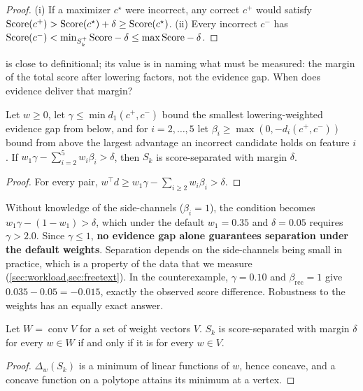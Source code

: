 \begin{proof}
(i) If a maximizer $c^\star$ were incorrect, any correct $c^+$ would satisfy $\mathrm{Score}(c^+) > \mathrm{Score}(c^\star) + \delta \geq \mathrm{Score}(c^\star)$. (ii) Every incorrect $c^-$ has $\mathrm{Score}(c^-) < \min_{S_k^+}\mathrm{Score} - \delta \leq \max\mathrm{Score} - \delta$.
\end{proof}

 is close to definitional; its value is in naming what must be measured: the margin of the total score after lowering factors, not the evidence gap. When does evidence deliver that margin?

\begin{proposition}
\label{prop:evidence}
Let $w \geq 0$, let $\gamma \leq \min d_1(c^+, c^-)$ bound the smallest lowering-weighted evidence gap from below, and for $i = 2, \dots, 5$ let $\beta_i \geq \max(0, -d_i(c^+, c^-))$ bound from above the largest advantage an incorrect candidate holds on feature $i$. If $w_1\gamma - \sum_{i=2}^{5} w_i\beta_i > \delta$, then $S_k$ is score-separated with margin $\delta$.
\end{proposition}

\begin{proof}
For every pair, $w^\top d \geq w_1\gamma - \sum_{i \geq 2} w_i\beta_i > \delta$.
\end{proof}

Without knowledge of the side-channels ($\beta_i = 1$), the condition becomes $w_1\gamma - (1 - w_1) > \delta$, which under the default $w_1 = 0.35$ and $\delta = 0.05$ requires $\gamma > 2.0$. Since $\gamma \leq 1$, \textbf{no evidence gap alone guarantees separation under the default weights}. Separation depends on the side-channels being small in practice, which is a property of the data that we measure (\cref{sec:workload,sec:freetext}). In the counterexample, $\gamma = 0.10$ and $\beta_{\textrm{rec}} = 1$ give $0.035 - 0.05 = -0.015$, exactly the observed score difference. Robustness to the weights has an equally exact answer.

\begin{corollary}
\label{cor:robustness}
Let $W = \operatorname{conv} V$ for a set of weight vectors $V$. $S_k$ is score-separated with margin $\delta$ for every $w \in W$ if and only if it is for every $w \in V$.
\end{corollary}

\begin{proof}
$\Delta_w(S_k)$ is a minimum of linear functions of $w$, hence concave, and a concave function on a polytope attains its minimum at a vertex.
\end{proof}

